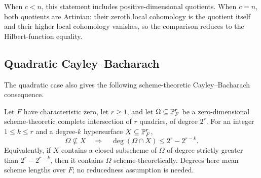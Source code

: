 When \(c<n\), this statement includes positive-dimensional quotients.
When \(c=n\), both quotients are Artinian: their zeroth local cohomology
is the quotient itself and their higher local cohomology vanishes, so the
comparison reduces to the Hilbert-function equality.

\subsection{Quadratic Cayley--Bacharach}

The quadratic case also gives the following scheme-theoretic
Cayley--Bacharach consequence.

\begin{corollary}
\label{cor:quadratic-cayley-bacharach}
Let \(F\) have characteristic zero, let \(r\ge1\), and let
\(\Omega\subseteq\mathbb P^r_F\) be a zero-dimensional scheme-theoretic complete
intersection of \(r\) quadrics, of degree \(2^r\). For an integer
\(1\le k\le r\) and a degree-\(k\) hypersurface \(X\subseteq\mathbb P^r_F\),
\[
 \Omega\not\subseteq X
 \quad\Longrightarrow\quad
 \deg(\Omega\cap X)\le 2^r-2^{r-k}.
\]
Equivalently, if \(X\) contains a closed subscheme of \(\Omega\) of degree
strictly greater than \(2^r-2^{r-k}\), then it contains \(\Omega\)
scheme-theoretically. Degrees here mean scheme lengths over \(F\);
no reducedness assumption is needed.
\end{corollary}

